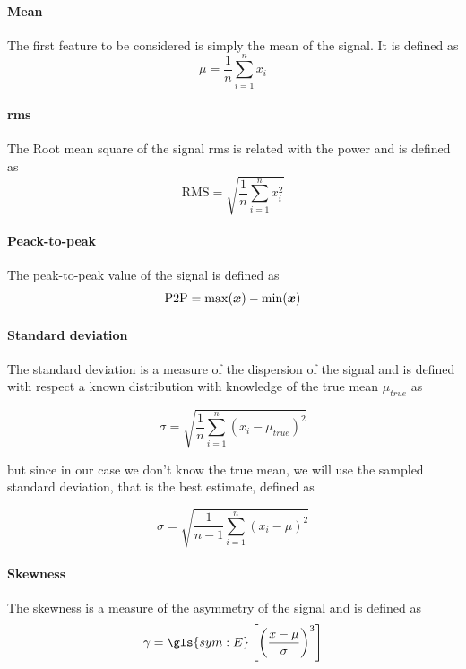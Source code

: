 \paragraph{Mean}
The first feature to be considered is simply the mean of the signal. It is defined as
\begin{equation}
    \mu = \frac{1}{n}\sum_{i=1}^n x_i
\end{equation}

\paragraph{\gls{rms}}
The Root mean square of the signal \gls{rms} is related with the power and is defined as
\begin{equation}
    \text{RMS} = \sqrt{\frac{1}{n}\sum_{i=1}^n x_i^2}
\end{equation}

\paragraph{Peack-to-peak}
The peak-to-peak value of the signal is defined as
\begin{equation}
    \text{P2P} = \max(\bm{x}) - \min(\bm{x})
\end{equation}

\paragraph{Standard deviation}
The standard deviation is a measure of the dispersion of the signal and is defined with respect a known distribution with knowledge of the true mean $\mu_{true}$ as

\begin{equation}
    {\sigma} = \sqrt{\frac{1}{n}\sum_{i=1}^n (x_i - \mu_{true})^2}
\end{equation}

but since in our case we don't know the true mean, we will use the sampled standard deviation, that is the best estimate, defined as

\begin{equation}
    \hat{\sigma} = \sqrt{\frac{1}{n-1}\sum_{i=1}^n (x_i - \mu)^2}
\end{equation}

\paragraph{Skewness}
The skewness is a measure of the asymmetry of the signal and is defined as
\begin{equation}
    \gamma = \gls{sym:E}\left[ \left(\frac{x - \mu}{\sigma}\right)^3 \right]
\end{equation}

